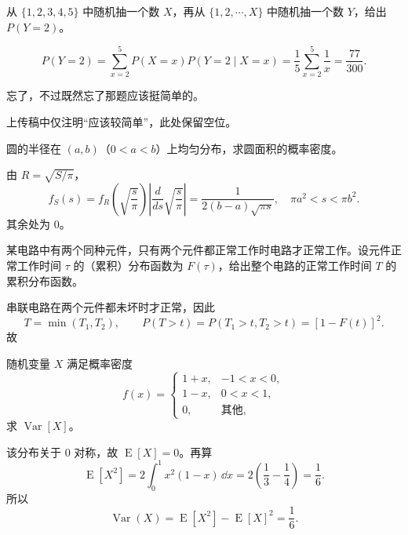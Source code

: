 ﻿

\begin{question}
从 $\{1,2,3,4,5\}$ 中随机抽一个数 $X$，再从 $\{1,2,\cdots,X\}$ 中随机抽一个数 $Y$，给出 $P(Y=2)$。
\begin{solution}
\[
P(Y=2)=\sum_{x=2}^{5}P(X=x)P(Y=2\mid X=x)
=\frac15\sum_{x=2}^{5}\frac1x
=\frac{77}{300}.
\]
\end{solution}
\end{question}

\begin{question}
忘了，不过既然忘了那题应该挺简单的。
\begin{solution}
上传稿中仅注明“应该较简单”，此处保留空位。
\end{solution}
\end{question}

\begin{question}
圆的半径在 $(a,b)$（$0<a<b$）上均匀分布，求圆面积的概率密度。
\begin{solution}
由 $R=\sqrt{S/\pi}$，
\[
 f_S(s)=f_R\!\left(\sqrt{\frac{s}{\pi}}\right)\left|\frac{d}{ds}\sqrt{\frac{s}{\pi}}\right|
 =\frac{1}{2(b-a)\sqrt{\pi s}},
\quad \pi a^2<s<\pi b^2.
\]
其余处为 $0$。
\end{solution}
\end{question}

\begin{question}
某电路中有两个同种元件，只有两个元件都正常工作时电路才正常工作。设元件正常工作时间 $\tau$ 的（累积）分布函数为 $F(\tau)$，给出整个电路的正常工作时间 $T$ 的累积分布函数。
\begin{solution}
串联电路在两个元件都未坏时才正常，因此
\[
T=\min(T_1,T_2),\qquad
P(T>t)=P(T_1>t,T_2>t)=[1-F(t)]^2.
\]
故

\end{solution}
\end{question}

\begin{question}
随机变量 $X$ 满足概率密度
\[
f(x)=\begin{cases}
1+x,&-1<x<0,\\
1-x,&0<x<1,\\
0,&\text{其他},
\end{cases}
\]
求 $\operatorname{Var}[X]$。
\begin{solution}
该分布关于 $0$ 对称，故 $\operatorname{E}[X]=0$。再算
\[
\operatorname{E}[X^2]=2\int_0^1 x^2(1-x)\,\dd{x}
=2\left(\frac13-\frac14\right)=\frac16.
\]
所以
\[
\operatorname{Var}(X)=\operatorname{E}[X^2]-\operatorname{E}[X]^2=\frac16.
\]
\end{solution}
\end{question}

